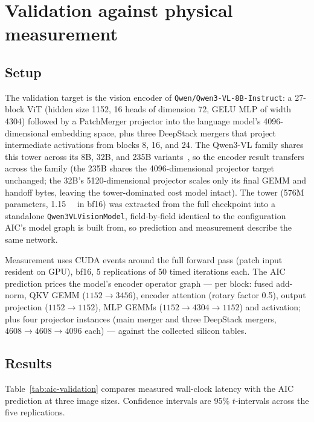 \section{Validation against physical measurement}
\label{sec:aic-validation}

\subsection{Setup}

The validation target is the vision encoder of
\texttt{Qwen/Qwen3-VL-8B-Instruct}: a 27-block ViT (hidden size 1152, 16
heads of dimension 72, GELU MLP of width 4304) followed by a PatchMerger
projector into the language model's \num{4096}-dimensional embedding
space, plus three DeepStack mergers that project intermediate activations
from blocks 8, 16, and 24. The Qwen3-VL family shares this tower across
its 8B, 32B, and 235B variants~\cite{Qwen3VL2025}, so the encoder result
transfers across the family (the 235B shares the 4096-dimensional projector
target unchanged; the 32B's 5120-dimensional projector scales only its final
GEMM and handoff bytes, leaving the tower-dominated cost model intact). The
tower (576M parameters, \SI{1.15}{\giga\byte} in bf16) was extracted from the
full checkpoint into a standalone \texttt{Qwen3VLVisionModel},
field-by-field identical to the configuration AIC's model graph is built
from, so prediction and measurement describe the same network.

Measurement uses CUDA events around the full forward pass (patch input
resident on GPU), bf16, 5 replications of 50 timed iterations each. The AIC
prediction prices the model's encoder operator graph --- per block: fused
add-norm, QKV GEMM ($1152\to3456$), encoder attention (rotary factor 0.5),
output projection ($1152\to1152$), MLP GEMMs ($1152\to4304\to1152$) and
activation; plus four projector instances (main merger and three DeepStack
mergers, $4608\to4608\to4096$ each) --- against the collected silicon tables.

\subsection{Results}

Table~\ref{tab:aic-validation} compares measured wall-clock latency with
the AIC prediction at three image sizes. Confidence intervals are 95\%
$t$-intervals across the five replications.

